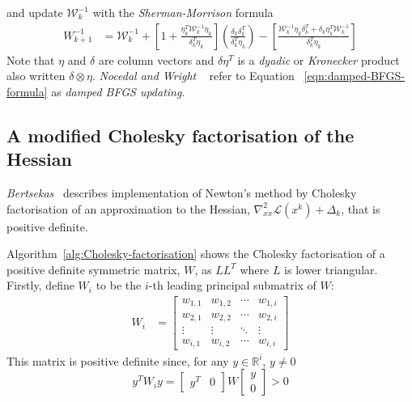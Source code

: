 \documentclass[a4paper,twoside,10pt,english]{report}
\begin{document}
and update $\mathcal{W}_{k}^{-1}$ with the \emph{Sherman-Morrison} formula
\begin{align*}
W_{k+1}^{-1} &= \mathcal{W}_{k}^{-1}+\left[1+\frac{\eta_{k}^{T}\mathcal{W}_{k}^{-1}\eta_{k}}{\delta_{k}^{T}\eta_{k}}\right]\left(\frac{\delta_{k}\delta_{k}^{T}}{\delta_{k}^{T}\eta_{k}}\right)-\left[\frac{\mathcal{W}_{k}^{-1}\eta_{k}\delta_{k}^{T}+\delta_{k}\eta_{k}^{T}\mathcal{W}_{k}^{-1}}{\delta_{k}^{T}\eta_{k}}\right]
\end{align*}
Note that  $\eta$ and $\delta$ are column vectors and $\delta\eta^{T}$
is a \emph{dyadic} or \emph{Kronecker }product also written $\delta\otimes\eta$.
\emph{Nocedal and Wright} 
~\cite[Procedure 18.2]{NocedalWright_NumericalOptimization} refer to Equation
~\ref{eqn:damped-BFGS-formula} as \emph{damped BFGS updating}.

\subsection{A modified Cholesky factorisation of the Hessian}
\emph{Bertsekas}~\cite[Appendix D]{Bertsekas_NonlinearProgramming} describes
implementation of Newton's method by Cholesky factorisation of an
approximation to the Hessian, $\nabla_{xx}^{2}\mathcal{L}(x^{k})+\Delta_{k}$,
that is positive definite.

Algorithm~\ref{alg:Cholesky-factorisation} shows the Cholesky factorisation
of a positive definite symmetric matrix, $W$, as $LL^{T}$ where $L$ is lower 
triangular. Firstly, define $W_{i}$ to be the $i$-th leading principal 
submatrix of $W$:
\begin{align*}
W_{i} &= \left[\begin{array}{cccc}
w_{1,1} & w_{1,2} & \cdots & w_{1,i}\\
w_{2,1} & w_{2,2} & \cdots & w_{2,i}\\
\vdots & \vdots & \ddots & \vdots\\
w_{i,1} & w_{i,2} & \cdots & w_{i,i}
\end{array}\right]
\end{align*}
This matrix is positive definite since, for any $y\in\mathbb{R}^{i}$,
$y\neq0$
\[
y^{T}W_{i}y=\left[\begin{array}{cc}
y^{T} & 0\end{array}\right]W\left[\begin{array}{c}
y\\
0
\end{array}\right]>0
\]
\end{document}
